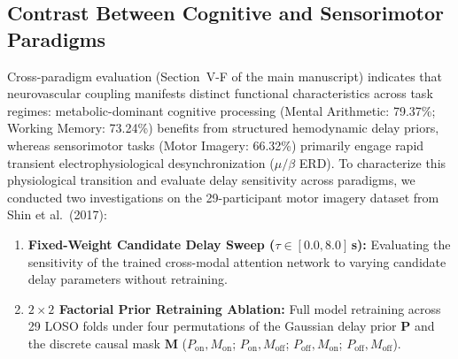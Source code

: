 \documentclass[journal]{IEEEtran}
\begin{document}
\subsection{Contrast Between Cognitive and Sensorimotor Paradigms}
Cross-paradigm evaluation (Section~V-F of the main manuscript) indicates that neurovascular coupling manifests distinct functional characteristics across task regimes: metabolic-dominant cognitive processing (Mental Arithmetic: 79.37\%; Working Memory: 73.24\%) benefits from structured hemodynamic delay priors, whereas sensorimotor tasks (Motor Imagery: 66.32\%) primarily engage rapid transient electrophysiological desynchronization ($\mu/\beta$ ERD). To characterize this physiological transition and evaluate delay sensitivity across paradigms, we conducted two investigations on the 29-participant motor imagery dataset from Shin et al.\ (2017):
\begin{enumerate}
    \item \textbf{Fixed-Weight Candidate Delay Sweep ($\tau \in [0.0, 8.0]$\,s):} Evaluating the sensitivity of the trained cross-modal attention network to varying candidate delay parameters without retraining.
    \item \textbf{$2 \times 2$ Factorial Prior Retraining Ablation:} Full model retraining across 29 LOSO folds under four permutations of the Gaussian delay prior $\mathbf{P}$ and the discrete causal mask $\mathbf{M}$ ($P_{\mathrm{on}}, M_{\mathrm{on}}$; $P_{\mathrm{on}}, M_{\mathrm{off}}$; $P_{\mathrm{off}}, M_{\mathrm{on}}$; $P_{\mathrm{off}}, M_{\mathrm{off}}$).
\end{enumerate}
\end{document}
